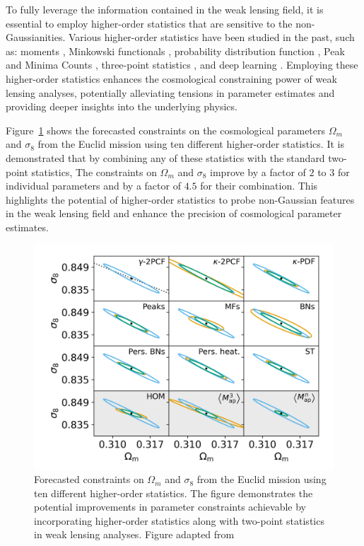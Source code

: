 To fully leverage the information contained in the weak lensing field, it is essential to employ higher-order statistics that are sensitive to the non-Gaussianities. Various higher-order statistics have been studied in the past, such as: moments \citep{2015PhRvD..91j3511P, 2020MNRAS.498.4060G}, Minkowski functionals \citep{2019JCAP...06..019M, 2022OJAp....5E..13G}, probability distribution function \citep{2021MNRAS.505.2886B, 2023arXiv230405928T, 2023OJAp....6E...1U}, Peak and Minima Counts \citep{2018MNRAS.474..712M, 2024MNRAS.528.4513M}, three-point statistics \citep{2004MNRAS.348..897T, 2014MNRAS.441.2725F}, and deep learning \citep{2018JCAP...10..051F, 2022PhRvD.105h3518F}. Employing these higher-order statistics enhances the cosmological constraining power of weak lensing analyses, potentially alleviating tensions in parameter estimates and providing deeper insights into the underlying physics. 

Figure~\ref{fig:Euclid_Forecast} \citep{2023A&A...675A.120E} shows the forecasted constraints on the cosmological parameters $\Omega_m$ and $\sigma_8$ from the Euclid mission using ten different higher-order statistics. It is demonstrated that by combining any of these statistics with the standard two-point statistics, The constraints on $\Omega_m$ and $\sigma_8$ improve by a factor of $2$ to $3$ for individual parameters and by a factor of $4.5$ for their combination. This highlights the potential of higher-order statistics to probe non-Gaussian features in the weak lensing field and enhance the precision of cosmological parameter estimates.

\begin{figure}[ht]
    \centering
    \includegraphics[width=\textwidth]{figures/Euclid_Forecast.png}
    \caption[Forecasted constraints on $\Omega_m$ and $\sigma_8$ from the Euclid mission using ten different higher-order statistics]{Forecasted constraints on $\Omega_m$ and $\sigma_8$ from the Euclid mission using ten different higher-order statistics. The figure demonstrates the potential improvements in parameter constraints achievable by incorporating higher-order statistics along with two-point statistics in weak lensing analyses. Figure adapted from \citet{2023A&A...675A.120E}}
    \label{fig:Euclid_Forecast}
\end{figure}

